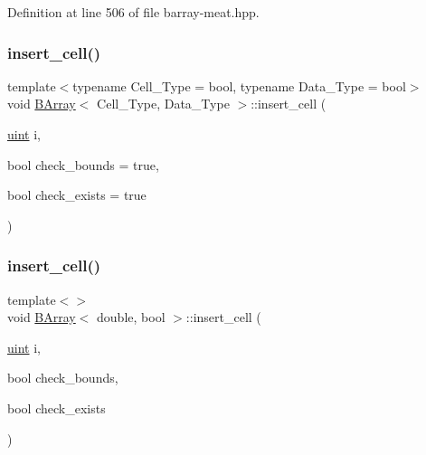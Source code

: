 Definition at line 506 of file barray-\/meat.\+hpp.

\mbox{\label{class_b_array_a8e930e9e59632684e9526f499bfff0e1}} 
\subsubsection{\texorpdfstring{insert\+\_\+cell()}{insert\_cell()}\hspace{0.1cm}{\footnotesize\ttfamily [6/10]}}
{\footnotesize\ttfamily template$<$typename Cell\+\_\+\+Type = bool, typename Data\+\_\+\+Type = bool$>$ \\
void \hyperlink{class_b_array}{B\+Array}$<$ Cell\+\_\+\+Type, Data\+\_\+\+Type $>$\+::insert\+\_\+cell (\begin{DoxyParamCaption}\item[{\hyperlink{typedefs_8hpp_a91ad9478d81a7aaf2593e8d9c3d06a14}{uint}}]{i,  }\item[{bool}]{check\+\_\+bounds = {\ttfamily true},  }\item[{bool}]{check\+\_\+exists = {\ttfamily true} }\end{DoxyParamCaption})}

\mbox{\label{class_b_array_a65aaf8f78714cd94616cf826b3eef6e1}} 
\subsubsection{\texorpdfstring{insert\+\_\+cell()}{insert\_cell()}\hspace{0.1cm}{\footnotesize\ttfamily [7/10]}}
{\footnotesize\ttfamily template$<$$>$ \\
void \hyperlink{class_b_array}{B\+Array}$<$ double, bool $>$\+::insert\+\_\+cell (\begin{DoxyParamCaption}\item[{\hyperlink{typedefs_8hpp_a91ad9478d81a7aaf2593e8d9c3d06a14}{uint}}]{i,  }\item[{bool}]{check\+\_\+bounds,  }\item[{bool}]{check\+\_\+exists }\end{DoxyParamCaption})\hspace{0.3cm}{\ttfamily [inline]}}



